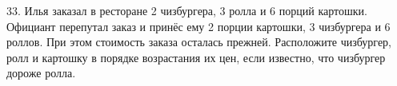 33. Илья заказал в ресторане 2 чизбургера, 3 ролла и 6 порций картошки. Официант перепутал заказ и принёс ему 2 порции картошки, 3 чизбургера и 6 роллов. При этом стоимость заказа осталась прежней. Расположите чизбургер, ролл и картошку в порядке возрастания их цен, если известно, что чизбургер дороже ролла.\\
